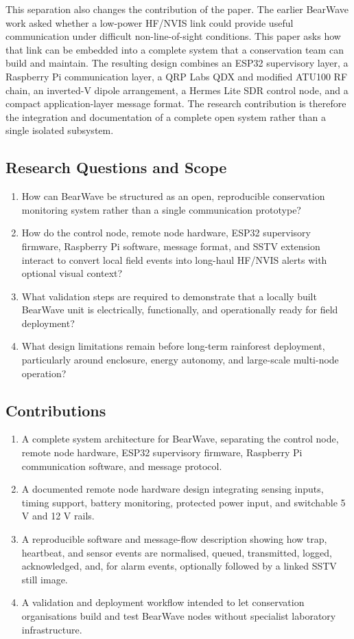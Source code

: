 \documentclass[acmsmall,screen]{acmart}
\begin{document}
This separation also changes the contribution of the paper. The earlier BearWave work asked whether a low-power HF/NVIS link could provide useful communication under difficult non-line-of-sight conditions. This paper asks how that link can be embedded into a complete system that a conservation team can build and maintain. The resulting design combines an ESP32 supervisory layer, a Raspberry Pi communication layer, a QRP Labs QDX and modified ATU100 RF chain, an inverted-V dipole arrangement, a Hermes Lite SDR control node, and a compact application-layer message format. The research contribution is therefore the integration and documentation of a complete open system rather than a single isolated subsystem.

\subsection{Research Questions and Scope}
\begin{enumerate}[label=\textbf{RQ\arabic*.}]
    \item How can BearWave be structured as an open, reproducible conservation monitoring system rather than a single communication prototype?
    \item How do the control node, remote node hardware, ESP32 supervisory firmware, Raspberry Pi software, message format, and SSTV extension interact to convert local field events into long-haul HF/NVIS alerts with optional visual context?
    \item What validation steps are required to demonstrate that a locally built BearWave unit is electrically, functionally, and operationally ready for field deployment?
    \item What design limitations remain before long-term rainforest deployment, particularly around enclosure, energy autonomy, and large-scale multi-node operation?
\end{enumerate}

\subsection{Contributions}
\begin{enumerate}[label=\textbf{C\arabic*.}]
    \item A complete system architecture for BearWave, separating the control node, remote node hardware, ESP32 supervisory firmware, Raspberry Pi communication software, and message protocol.
    \item A documented remote node hardware design integrating sensing inputs, timing support, battery monitoring, protected power input, and switchable 5 V and 12 V rails.
    \item A reproducible software and message-flow description showing how trap, heartbeat, and sensor events are normalised, queued, transmitted, logged, acknowledged, and, for alarm events, optionally followed by a linked SSTV still image.
    \item A validation and deployment workflow intended to let conservation organisations build and test BearWave nodes without specialist laboratory infrastructure.
\end{enumerate}
\end{document}
